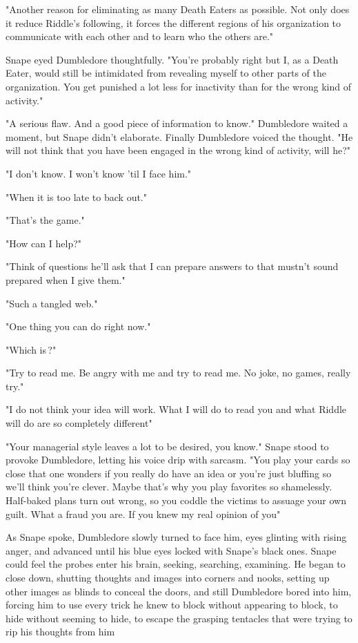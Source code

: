 "Another reason for eliminating as many Death Eaters as possible. Not only does it reduce Riddle's following, it forces the different regions of his organization to communicate with each other and to learn who the others are."

Snape eyed Dumbledore thoughtfully. "You're probably right but I, as a Death Eater, would still be intimidated from revealing myself to other parts of the organization. You get punished a lot less for inactivity than for the wrong kind of activity."

"A serious flaw. And a good piece of information to know." Dumbledore waited a moment, but Snape didn't elaborate. Finally Dumbledore voiced the thought. "He will not think that you have been engaged in the wrong kind of activity, will he?"

"I don't know. I won't know 'til I face him."

"When it is too late to back out."

"That's the game."

"How can I help?"

"Think of questions he'll ask that I can prepare answers to that mustn't sound prepared when I give them."

"Such a tangled web."

"One thing you can do right now."

"Which is{\el}\,?"

"Try to read me. Be angry with me and try to read me. No joke, no games, really try."

"I do not think your idea will work. What I will do to read you and what Riddle will do are so completely different{\el}"

"Your managerial style leaves a lot to be desired, you know." Snape stood to provoke Dumbledore, letting his voice drip with sarcasm. "You play your cards so close that one wonders if you really do have an idea or you're just bluffing so we'll think you're clever. Maybe that's why you play favorites so shamelessly. Half-baked plans turn out wrong, so you coddle the victims to assuage your own guilt. What a fraud you are. If you knew my real opinion of you{\el}"

As Snape spoke, Dumbledore slowly turned to face him, eyes glinting with rising anger, and advanced until his blue eyes locked with Snape's black ones. Snape could feel the probes enter his brain, seeking, searching, examining. He began to close down, shutting thoughts and images into corners and nooks, setting up other images as blinds to conceal the doors, and still Dumbledore bored into him, forcing him to use every trick he knew to block without appearing to block, to hide without seeming to hide, to escape the grasping tentacles that were trying to rip his thoughts from him{\el}

